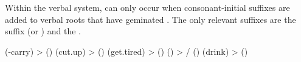 Within the verbal system,  can only occur when consonant-initial suffixes are added to verbal roots that have geminated . The only relevant suffixes are the  suffix  (or ) and the  .
%
\begin{exe}
	\ex	\label{ex:degemination masdar locative phon}
	\begin{xlist}
		\ex	{} (-carry) >  ()
		\ex	{} (cut.up) >  ()
		\ex	{} (get.tired) >  ()
		\ex	{} () > \slash{} ()
		\ex	{} (drink) >  ()
	\end{xlist}
\end{exe}
